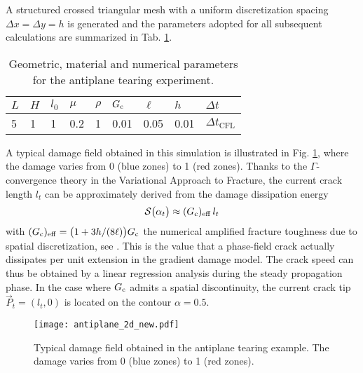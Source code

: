 A structured crossed triangular mesh with a uniform discretization spacing $\Delta x=\Delta y=h$ is generated and the parameters adopted for all subsequent calculations are summarized in Tab. \ref{tab:paraanti}.
\begin{table}[htbp]
\centering
\caption{Geometric, material and numerical parameters for the antiplane tearing experiment.} \label{tab:paraanti}
\begin{tabular}{lllllllll} \toprule
$L$ & $H$ & $l_0$ & $\mu$ & $\rho$ & $G_\mathrm{c}$ & $\ell$ & $h$ & $\Delta t$\\ \midrule
5 & 1 & 1 & 0.2 & 1 & 0.01 & 0.05 & 0.01 & $\Delta t_\mathrm{CFL}$ \\ \bottomrule
\end{tabular}
\end{table}
A typical damage field obtained in this simulation is illustrated in Fig. \ref{fig:antiplane_2d_new}, where the damage varies from 0 (blue zones) to 1 (red zones). Thanks to the $\Gamma$-convergence theory in the Variational Approach to Fracture, the current crack length $l_t$ can be approximately derived from the damage dissipation energy
\begin{equation} \label{eq:ltapprox}
\mathcal{S}\bigl(\alpha_t\bigr)\approx(G_\mathrm{c})_\mathrm{eff}\,l_t
\end{equation}
with $(G_\mathrm{c})_\mathrm{eff}=\bigl(1+3h/(8\ell)\bigr)G_\mathrm{c}$ the numerical amplified fracture toughness due to spatial discretization, see \cite{BourdinFrancfortMarigo:2008,HossainHsuehBourdinBhattachary:2014}. This is the value that a phase-field crack actually dissipates per unit extension in the gradient damage model. The crack speed can thus be obtained by a linear regression analysis during the steady propagation phase. In the case where $G_\mathrm{c}$ admits a spatial discontinuity, the current crack tip $\vec{P}_t=(l_t,0)$ is located on the contour $\alpha=0.5$.
\begin{figure}[htbp]
\texttt{[image: antiplane\_2d\_new.pdf]}
\caption{Typical damage field obtained in the antiplane tearing example. The damage varies from 0 (blue zones) to 1 (red zones).} \label{fig:antiplane_2d_new}
\end{figure}

